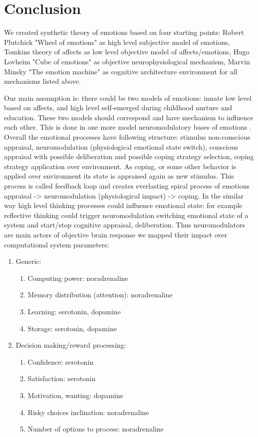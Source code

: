 \section{Conclusion}

We created synthetic theory of emotions based on four starting points: Robert Plutchick "Wheel of emotions" \cite{natureofemotions, senticcomputing} as high level subjective model of emotions, Tomkins theory of affects \cite{primer_affect_psychology} as low level objective model of affects/emotions, Hugo Lovheim "Cube of emotions" \cite{cubeofemotions} as objective neurophysiological mechanism, Marvin Minsky "The emotion machine" \cite{emotionmachine} as cognitive architecture environment for all mechanisms listed above.

Our main assumption is: there could be two models of emotions: innate low level based on affects, and high level self-emerged during childhood nurture and education. These two models should correspond and have mechanism to influence each other. This is done in one more model neuromodulatory bases of emotions \cite{cubeofemotions, neuromodulatory}.
Overall the emotional processes have following structure: stimulus non-conscious appraisal, neuromodulation (physiological emotional state switch), conscious appraisal with possible deliberation and possible coping strategy selection, coping strategy application over environment. As coping, or some other behavior is applied over environment its state is appraised again as new stimulus. This process is called feedback loop \cite{natureofemotions} and creates everlasting spiral process of emotions appraisal -> neuromodulation (physiological impact) -> coping. In the similar way high level thinking processes could influence emotional state: for example reflective thinking could trigger neuromodulation switching emotional state of a system and start/stop cognitive appraisal, deliberation.
Thus neuromodulators are main actors of objective brain response we mapped their impact over computational system parameters:

\begin{enumerate}
 \item  Generic:
 \begin{enumerate}
  \item  Computing power: noradrenaline
  \item  Memory distribution (attention): noradrenaline
  \item  Learning: serotonin, dopamine
  \item  Storage: serotonin, dopamine
 \end{enumerate}
 \item  Decision making/reward processing:
 \begin{enumerate}
  \item  Confidence: serotonin
  \item  Satisfaction: serotonin
  \item  Motivation, wanting: dopamine
  \item  Risky choices inclination: noradrenaline
  \item  Number of options to process: noradrenaline
 \end{enumerate}
\end{enumerate}

